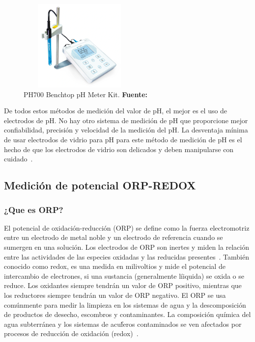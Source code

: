 \begin{itemize}
\begin{figure}[ht]
    \centering
    \includegraphics[width=60mm, height=45mm]{Imagenes/cap2/ph700.png}
    \caption {PH700 Benchtop pH Meter Kit. \textbf{Fuente:}
    \cite{ph700_nodate} }
    \label{fig:ph700}
    \end{figure}
\end{itemize}

De todos estos métodos de medición del valor de pH,  el mejor es el uso de electrodos de pH. 
No hay otro sistema de medición de pH que proporcione mejor confiabilidad, precisión y velocidad de la medición del pH. 
La desventaja mínima de usar electrodos de vidrio para pH para este m\'etodo de medici\'on de pH es el hecho de que los electrodos de vidrio son delicados y deben manipularse con cuidado~\cite{li_chapter_2019}.


\subsection{Medición de potencial ORP-REDOX}
\subsubsection{¿Que es ORP?}
El potencial de oxidaci\'on-reducci\'on (ORP) se define como la fuerza electromotriz entre un electrodo de metal noble y un electrodo de referencia cuando se sumergen en una soluci\'on.
Los electrodos de ORP son inertes y miden la relaci\'on entre las actividades de las especies oxidadas y las reducidas presentes~\cite{d19_committee_test_nodate}.
Tambi\'en conocido como redox, es una medida en milivoltios y mide el potencial de intercambio de electrones, si una sustancia (generalmente l\'iiquida) se oxida o se reduce. 
Los oxidantes siempre tendrán un valor de ORP positivo, mientras que los reductores siempre tendrán un valor de ORP negativo. 
El ORP se usa com\'unmente para medir la limpieza en los sistemas de agua y la descomposici\'on de productos de desecho, escombros y contaminantes. 
La composici\'on química del agua subterránea y los sistemas de acu\'feros contaminados se ven afectados por procesos de reducción de oxidación (redox)~\cite{wator_redox_2020}.

